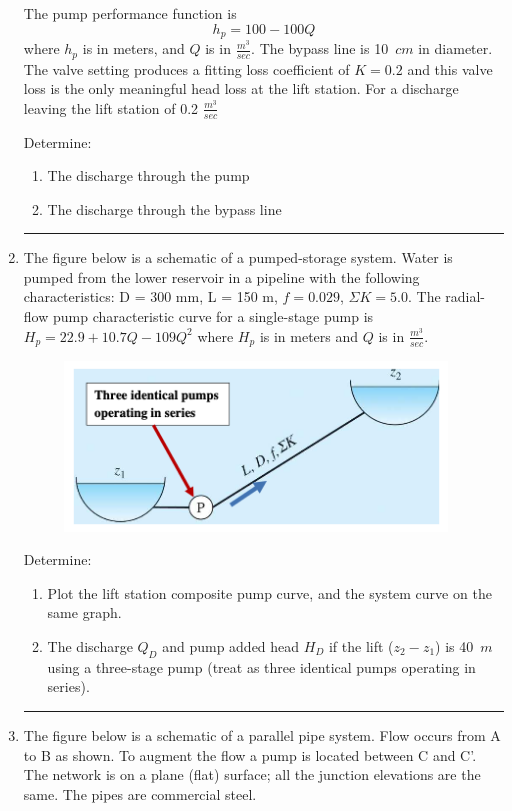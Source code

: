 \documentclass[12pt]{article}
\begin{document}
\begin{enumerate}
The pump performance function is $$h_p = 100 - 100Q$$ where $h_p$ is in meters, and $Q$ is in $\frac{m^3}{sec}$. 
The bypass line is 10~$cm$ in diameter.  The valve setting produces a fitting loss coefficient of $K=0.2$ and this valve loss is the only meaningful head loss at the lift station.  
For a discharge leaving the lift station of 0.2 $\frac{m^3}{sec}$ 

Determine:
\begin{enumerate}
\item The discharge through the pump
\item The discharge through the bypass line
\end{enumerate}

\noindent\rule{\linewidth}{0.4pt}
\clearpage
\item The figure below is a schematic of a pumped-storage system. Water is pumped from the lower reservoir in a pipeline with the following characteristics: D = 300 mm, L = 150 m, $f = 0.029$, $\Sigma K = 5.0$. The radial-flow pump characteristic curve for a single-stage pump is $H_p = 22.9 + 10.7Q -109Q^2$ where $H_p$ is in meters and $Q$ is in $\frac{m^3}{sec}$.

\begin{figure}[h!] %
   \centering
   \includegraphics[width=4in]{pss-2.png} 
   \caption{}
   \label{fig:pss-2}
\end{figure}

Determine:
\begin{enumerate}
\item Plot the lift station composite pump curve, and the system curve on the same graph. 
\item The discharge $Q_D$ and pump added head $H_D$ if the lift ($z_2 - z_1$) is 40~$m$ using a three-stage pump (treat as three identical pumps operating in series).
\end{enumerate}

\noindent\rule{\linewidth}{0.4pt}
\clearpage
\item The figure below is a schematic of a parallel pipe system.  Flow occurs from A to B as shown. To augment the flow a pump is located between C and C'. The network is on a plane (flat) surface; all the junction elevations are the same. The pipes are commercial steel.


\end{enumerate}
\end{document}
